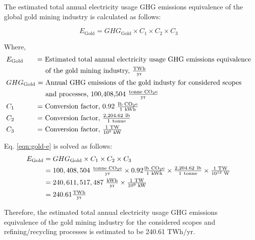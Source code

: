The estimated total annual electricity usage GHG emissions equivalence of the global gold mining industry is calculated as follows:

\begin{equation}\label{eqn:gold-e}
E_\textrm{Gold} = GHG_\textrm{Gold} \times C_1 \times C_2 \times C_3
\end{equation}

\noindent
Where,
\begin{align*}
&E_\textrm{Gold}		\textrm{ \quad \ \ = Estimated total annual electricity usage GHG emissions equivalence} \\
&\textrm{ \qquad \qquad \ \ \ \ of the gold mining industry, $\tfrac{ \textrm{{T}Wh} } { \textrm{yr} }$ } \\
&GHG_\textrm{Gold} \textrm{ = Annual GHG emissions of the gold industy for considered scopes} \\
&\textrm{ \qquad \qquad \ \ \ \ and processes, 100,408,504 $\tfrac{\textrm{tonne CO\textsubscript{2}e}} {\textrm{yr}} $ } \\
&C_1                \textrm{ \qquad \quad = Conversion factor, $0.92 \ \tfrac{\textrm{lb CO\textsubscript{2}e}}{1 \ \textrm{kWh}} $} \\
&C_2                \textrm{ \qquad \quad = Conversion factor, $\tfrac { 2,204.62 \ \textrm{lb} }{1 \ \textrm{tonne} }$ } \\
&C_3                \textrm{ \qquad \quad = Conversion factor, $\tfrac{1 \textrm{ TW} } { 10^9 \textrm{ kW}}$ } \\
\end{align*}

Eq. \eqref{eqn:gold-e} is solved as follows:
\begin{align}\label{eqn:gold-e-res}
  E_\textrm{Gold} &= GHG_\textrm{Gold} \times C_1 \times C_2 \times C_3 \nonumber \\
                  &= 100,408,504 \ \tfrac{\textrm{tonne CO\textsubscript{2}e}} {\textrm{yr}} \times 0.92 \tfrac{\textrm{lb} \ \textrm{CO\textsubscript{2}e}}{1 \ \textrm{kWh}} \times \tfrac{ 2,204.62 \ \textrm{lb}}{1 \ \textrm{tonne}}  \times \convtw \nonumber \\
                  &= 240,611,517,487 \ \kwhyr \times \convtk \nonumber \\
                  &= 240.61 \xwhyr{T}
\end{align}

Therefore, the estimated total annual electricity usage GHG emissions equivalence of the gold mining industry for the considered scopes and refining/recycling processes is estimated to be 240.61 TWh/yr.
